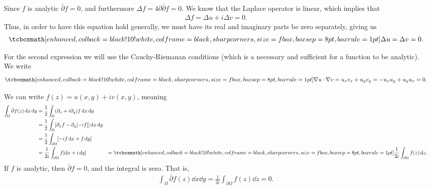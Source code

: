 
Since $f$ is analytic $\bar{\partial}f = 0$, and furthermore $\Delta f = 4\partial\bar{\partial}f = 0$.
We know that the Laplace operator is linear, which implies that
\begin{eqnarray}
    \label{eq:lap-f-uv}
    \Delta f = \Delta u + i \Delta v = 0 
.\end{eqnarray}
Thus, in order to have this equation hold generally, we must have its real and imaginary parts be zero separately, giving us
\begin{eqnarray}
    \label{eq:uv-harmonic}
    \eqbox{
    \Delta u = \Delta v = 0 
}
.\end{eqnarray}

For the second expression we will use the Cauchy-Riemanan conditions (which is a necessary and sufficient for a function to be analytic).
We write
\begin{eqnarray}
    \label{eq:gradu-gradv}
    \eqbox{
    \nabla u \cdot \nabla v = u_{x}v_{x} + u_{y}v_{y} = -u_{x}u_{y} + u_{y}u_{x} = 0
}
.\end{eqnarray}




We can write $f(z) = u(x,y) + iv(x,y)$, meaning
\begin{align}
    \label{eq:int-rewrite}
    \int_{\Omega} \bar{\partial}f(z) \dd{x}\dd{y} &= \frac{1}{2} \int_{\Omega} (\partial_{x} + i \partial_{y})f \dd{x}\dd{y} \\
    &= \frac{1}{2} \int_{\Omega} [\partial_{x} f - \partial_{y} [-if]] \dd{x}\dd{y} \\
    &= \frac{1}{2} \int_{\partial \Omega} [-if \dd{x} + f\dd{y}] \\
    &= \frac{1}{2i} \int_{\partial \Omega} f[\dd{x} + i\dd{y}]
    &= \eqbox{ \frac{1}{2i} \int_{\partial \Omega} f(z) \dd{z} }
.\end{align}
If $f$ is analytic, then $\bar{\partial}f = 0$, and the integral is zero.
That is,
\begin{eqnarray}
    \label{eq:closed-loop-integral}
    \int_{\Omega} \bar{\partial}f(z) \dd{x}\dd{y} = \frac{1}{2i} \int_{\partial \Omega} f(z) \dd{z} = 0
.\end{eqnarray}






